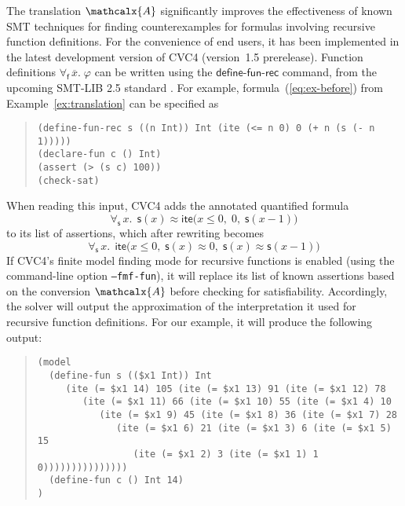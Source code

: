 \documentclass[runningheads,a4paper]{llncs}
\newcommand{\con}[1]{\mathsf{#1}}
\renewcommand\vec[1]{\overline{#1}}
\newcommand\cvc{CVC4\xspace}
\newcommand{\teq}{\approx}
\newcommand{\conv}{\mathcalx{A}}
\newcommand{\lite}{\con{ite}}
\newcommand{\forallf}[1]{\forall_{\!#1\:}}
\newcommand{\rem}[1]{\textcolor{red}{[#1]}}
\newcommand{\ajr}[1]{\rem{#1 --ajr}}
\newcommand{\jb}[1]{\rem{#1 --jb}}
\newcommand{\definefunreccmd}{\con{define}\text{-}\con{fun}\text{-}\con{rec}}
\begin{document}
The translation $\conv$ significantly improves the effectiveness of known SMT
techniques for finding counterexamples for formulas involving recursive
function definitions.
For the convenience of end users, it
has been implemented in the latest development version of \cvc %
(version~1.5 prerelease).
Function definitions $\forallf{\con{f}} \vec x.\; \varphi$ can be written using the $\definefunreccmd$ command,
from the upcoming SMT-LIB 2.5 standard \cite{smtlib25}.
For example, formula~(\ref{eq:ex-before}) from Example~\ref{ex:translation}
can be specified as
%
\begin{quote}
\small
\begin{verbatim}
(define-fun-rec s ((n Int)) Int (ite (<= n 0) 0 (+ n (s (- n 1)))))
(declare-fun c () Int)
(assert (> (s c) 100))
(check-sat)
\end{verbatim}
\end{quote}
%
When reading this input,
\cvc adds the annotated quantified formula
$$\forallf{\con{s}} x.\;\, \con{s}( x ) \teq \lite\bigl( x \leq 0,\; 0,\; \con{s}( x-1 )\bigr)$$
to its list of assertions,
which after rewriting becomes
$$\forallf{\con{s}} x.\;\, \lite\bigl( x \leq 0,\; \con{s}( x ) \teq 0,\; \con{s}( x ) \teq \con{s}( x-1 ) \bigr)$$
If \cvc's finite model finding mode for recursive functions is enabled (using
the command-line option \texttt{--fmf-fun}), it will replace its list of known
assertions based on the conversion $\conv$ before checking for satisfiability.
Accordingly, the solver will output the approximation of the interpretation it
used for recursive function definitions. For our example, it will produce the following output:
%
\begin{quote}
\small
\begin{verbatim}
(model
  (define-fun s (($x1 Int)) Int 
     (ite (= $x1 14) 105 (ite (= $x1 13) 91 (ite (= $x1 12) 78 
        (ite (= $x1 11) 66 (ite (= $x1 10) 55 (ite (= $x1 4) 10 
           (ite (= $x1 9) 45 (ite (= $x1 8) 36 (ite (= $x1 7) 28 
              (ite (= $x1 6) 21 (ite (= $x1 3) 6 (ite (= $x1 5) 15 
                 (ite (= $x1 2) 3 (ite (= $x1 1) 1 0)))))))))))))))
  (define-fun c () Int 14)
)
\end{verbatim}
\end{quote}
\end{document}
